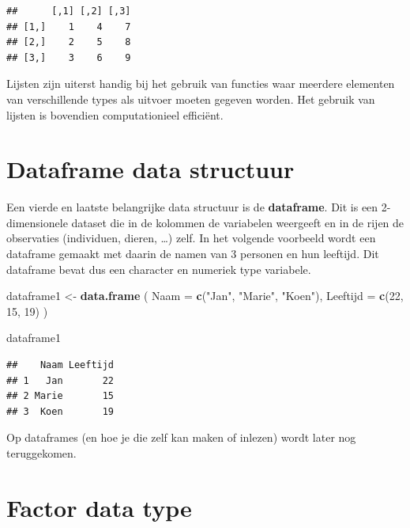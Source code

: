 \documentclass[
]{book}
\newenvironment{Shaded}{\begin{snugshade}}{\end{snugshade}}
\newcommand{\AttributeTok}[1]{\textcolor[rgb]{0.13,0.29,0.53}{#1}}
\newcommand{\DecValTok}[1]{\textcolor[rgb]{0.00,0.00,0.81}{#1}}
\newcommand{\FunctionTok}[1]{\textcolor[rgb]{0.13,0.29,0.53}{\textbf{#1}}}
\newcommand{\NormalTok}[1]{#1}
\newcommand{\OtherTok}[1]{\textcolor[rgb]{0.56,0.35,0.01}{#1}}
\newcommand{\StringTok}[1]{\textcolor[rgb]{0.31,0.60,0.02}{#1}}
\begin{document}
\begin{verbatim}
##      [,1] [,2] [,3]
## [1,]    1    4    7
## [2,]    2    5    8
## [3,]    3    6    9
\end{verbatim}

Lijsten zijn uiterst handig bij het gebruik van functies waar meerdere elementen van verschillende types als uitvoer moeten gegeven worden. Het gebruik van lijsten is bovendien computationieel efficiënt.

\hypertarget{dataframe-data-structuur}{%
\section{Dataframe data structuur}\label{dataframe-data-structuur}}

Een vierde en laatste belangrijke data structuur is de \textbf{dataframe}. Dit is een 2-dimensionele dataset die in de kolommen de variabelen weergeeft en in de rijen de observaties (individuen, dieren, \ldots) zelf. In het volgende voorbeeld wordt een dataframe gemaakt met daarin de namen van 3 personen en hun leeftijd. Dit dataframe bevat dus een character en numeriek type variabele.

\begin{Shaded}
\begin{Highlighting}[]
\NormalTok{dataframe1 }\OtherTok{\textless{}{-}} \FunctionTok{data.frame}\NormalTok{ (}
  \AttributeTok{Naam =} \FunctionTok{c}\NormalTok{(}\StringTok{"Jan"}\NormalTok{, }\StringTok{"Marie"}\NormalTok{, }\StringTok{"Koen"}\NormalTok{),}
  \AttributeTok{Leeftijd =} \FunctionTok{c}\NormalTok{(}\DecValTok{22}\NormalTok{, }\DecValTok{15}\NormalTok{, }\DecValTok{19}\NormalTok{)}
\NormalTok{)}

\NormalTok{dataframe1}
\end{Highlighting}
\end{Shaded}

\begin{verbatim}
##    Naam Leeftijd
## 1   Jan       22
## 2 Marie       15
## 3  Koen       19
\end{verbatim}

Op dataframes (en hoe je die zelf kan maken of inlezen) wordt later nog teruggekomen.

\hypertarget{factor-data-type}{%
\section{Factor data type}\label{factor-data-type}}
\end{document}
